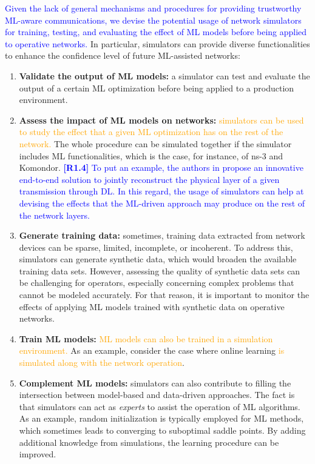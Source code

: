 \documentclass[journal]{IEEEtran}
\begin{document}
	\textcolor{blue}{Given the lack of general mechanisms and procedures for providing trustworthy ML-aware communications, we devise the potential usage of network simulators for training, testing, and evaluating the effect of ML models before being applied to operative networks.} In particular, simulators can provide diverse functionalities to enhance the confidence level of future ML-assisted networks: 
	\begin{enumerate}
		\item \textbf{Validate the output of ML models:} a simulator can test and evaluate the output of a certain ML optimization before being applied to a production environment. 
		\item \textbf{Assess the impact of ML models on networks:} \textcolor{orange}{simulators can be used to study the effect that a given ML optimization has on the rest of the network.} The whole procedure can be simulated together if the simulator includes ML functionalities, which is the case, for instance, of ns-3 and Komondor. \textcolor{blue}{\textbf{[R1.4]} To put an example, the authors in \cite{survey6} propose an innovative end-to-end solution to jointly reconstruct the physical layer of a given transmission through DL. In this regard, the usage of simulators can help at devising the effects that the ML-driven approach may produce on the rest of the network layers.}	
		\item \textbf{Generate training data:} sometimes, training data extracted from network devices can be sparse, limited, incomplete, or incoherent. To address this, simulators can generate synthetic data, which would broaden the available training data sets. However, assessing the quality of synthetic data sets can be challenging for operators, especially concerning complex problems that cannot be modeled accurately. For that reason, it is important to monitor the effects of applying ML models trained with synthetic data on operative networks.
		\item \textbf{Train ML models:} \textcolor{orange}{ML models can also be trained in a simulation environment.} As an example, consider the case where online learning \textcolor{orange}{is simulated along with the network operation}. 
		\item \textbf{Complement ML models:} simulators can also contribute to filling the intersection between model-based and data-driven approaches. The fact is that simulators can act as \textit{experts} to assist the operation of ML algorithms. As an example, random initialization is typically employed for ML methods, which sometimes leads to converging to suboptimal saddle points. By adding additional knowledge from simulations, the learning procedure can be improved.
	\end{enumerate}
			
\end{document}
